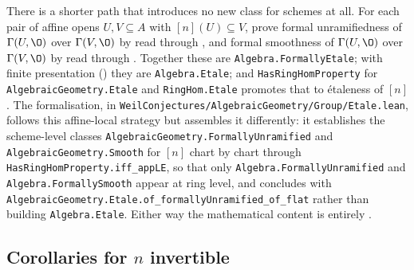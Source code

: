 \begin{remark}
\label{rem:av-etale-formalisation-route}
There is a shorter path that introduces no new class for schemes at all.  For
each pair of affine opens $U,V\subseteq A$ with $[n](U)\subseteq V$, prove
formal unramifiedness of $\Gamma(U,\O)$ over $\Gamma(V,\O)$ by
 read through
, and formal smoothness of $\Gamma(U,\O)$
over $\Gamma(V,\O)$ by  read through
.  Together these are
\texttt{Algebra.FormallyEtale}; with finite presentation
() they are \texttt{Algebra.Etale}; and
\texttt{HasRingHomProperty} for \texttt{AlgebraicGeometry.Etale} and
\texttt{RingHom.Etale} promotes that to \'etaleness of $[n]$.  The
formalisation, in
\texttt{WeilConjectures/AlgebraicGeometry/Group/Etale.lean}, follows this
affine-local strategy but assembles it differently: it establishes the
scheme-level classes \texttt{AlgebraicGeometry.FormallyUnramified} and
\texttt{AlgebraicGeometry.Smooth} for $[n]$ chart by chart through
\texttt{HasRingHomProperty.iff\_appLE}, so that only
\texttt{Algebra.FormallyUnramified} and \texttt{Algebra.FormallySmooth} appear
at ring level, and concludes with
\texttt{AlgebraicGeometry.Etale.of\_formallyUnramified\_of\_flat} rather than
building \texttt{Algebra.Etale}.  Either way the mathematical content is
entirely .
\end{remark}

\subsection{Corollaries for $n$ invertible}\label{sec:av-etale-corollaries}


